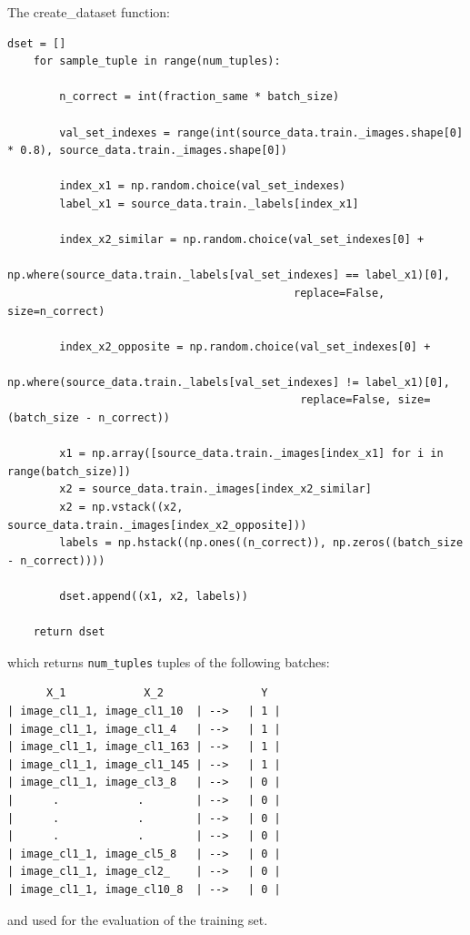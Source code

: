 \documentclass{article}
\begin{document}
The create\_dataset function:
\begin{tiny}
\begin{verbatim}
dset = []
    for sample_tuple in range(num_tuples):

        n_correct = int(fraction_same * batch_size)

        val_set_indexes = range(int(source_data.train._images.shape[0] * 0.8), source_data.train._images.shape[0])

        index_x1 = np.random.choice(val_set_indexes)
        label_x1 = source_data.train._labels[index_x1]

        index_x2_similar = np.random.choice(val_set_indexes[0] +
                                            np.where(source_data.train._labels[val_set_indexes] == label_x1)[0],
                                            replace=False, size=n_correct)

        index_x2_opposite = np.random.choice(val_set_indexes[0] +
                                             np.where(source_data.train._labels[val_set_indexes] != label_x1)[0],
                                             replace=False, size=(batch_size - n_correct))

        x1 = np.array([source_data.train._images[index_x1] for i in range(batch_size)])
        x2 = source_data.train._images[index_x2_similar]
        x2 = np.vstack((x2, source_data.train._images[index_x2_opposite]))
        labels = np.hstack((np.ones((n_correct)), np.zeros((batch_size - n_correct))))

        dset.append((x1, x2, labels))

    return dset
\end{verbatim}
\end{tiny}
which returns \texttt{num\_tuples} tuples of the following batches:
\begin{verbatim}
      X_1            X_2               Y
| image_cl1_1, image_cl1_10  | -->   | 1 |
| image_cl1_1, image_cl1_4   | -->   | 1 |
| image_cl1_1, image_cl1_163 | -->   | 1 |
| image_cl1_1, image_cl1_145 | -->   | 1 |
| image_cl1_1, image_cl3_8   | -->   | 0 |
|      .            .        | -->   | 0 |
|      .            .        | -->   | 0 |
|      .            .        | -->   | 0 |
| image_cl1_1, image_cl5_8   | -->   | 0 |
| image_cl1_1, image_cl2_    | -->   | 0 |
| image_cl1_1, image_cl10_8  | -->   | 0 |
\end{verbatim}
and used for the evaluation of the training set.
\end{document}
